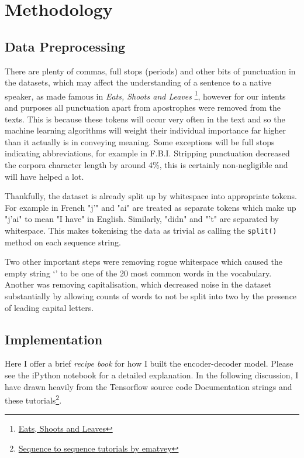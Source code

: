 \documentclass[]{article}
\begin{document}
\section{Methodology}
\subsection{Data Preprocessing}
There are plenty of commas, full stops (periods) and other bits of punctuation in the datasets, which may affect the understanding of a sentence to a native speaker, as made famous in \textit{Eats, Shoots and Leaves} \footnote{\href{https://en.wikipedia.org/wiki/Eats,_Shoots_\%26_Leaves}{Eats, Shoots and Leaves}}, however for our intents and purposes all punctuation apart from apostrophes were removed from the texts. This is because these tokens will occur very often in the text and so the machine learning algorithms will weight their individual importance far higher than it actually is in conveying meaning. Some exceptions will be full stops indicating abbreviations, for example in F.B.I. Stripping punctuation decreased the corpora character length by around 4\%, this is certainly non-negligible and will have helped a lot.

Thankfully, the dataset is already split up by whitespace into appropriate tokens. For example in French "j'" and "ai" are treated as separate tokens which make up "j'ai" to mean "I have" in English. Similarly, "didn" and "'t" are separated by whitespace. This makes tokenising the data as trivial as calling the \lstinline{split()} method on each sequence string.

Two other important steps were removing rogue whitespace which caused the empty string `' to be one of the 20 most common words in the vocabulary. Another was removing capitalisation, which decreased noise in the dataset substantially by allowing counts of words to not be split into two by the presence of leading capital letters.

\subsection{Implementation}
Here I offer a brief \textit{recipe book} for how I built the encoder-decoder model. Please see the iPython notebook for a detailed explanation. In the following discussion, I have drawn heavily from the Tensorflow source code Documentation strings and these tutorials\footnote{ \href{https://github.com/ematvey/tensorflow-seq2seq-tutorials}{Sequence to sequence tutorials by ematvey}}.
\end{document}

